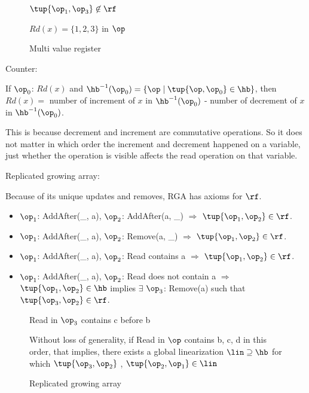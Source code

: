 \begin{figure}[H]
  \centering
  \begin{minipage}{.45\textwidth}
    
    \caption{$\tup{\op_1, \op_3} \not\in \rf$}
    \label{mvreg:a}
  \end{minipage}
  \begin{minipage}{.45\textwidth}
    
    \caption{$Rd(x) = \{1,2,3\}$ in $\op$}
    \label{mvreg:b}
  \end{minipage}
  \caption{Multi value register}
\end{figure}

Counter:

If $\op_0$: $Rd(x)$ and $\hb^{-1}(\op_0) = \{\op \mid \tup{\op, \op_0} \in \hb\}$, then $Rd(x) = $ number of increment of $x$ in $\hb^{-1}(\op_0)$ - number of decrement of $x$ in $\hb^{-1}(\op_0)$.

This is because decrement and increment are commutative operations. So it does not matter in which order the increment and decrement happened on a variable, just whether the operation is visible affects the read operation on that variable.

Replicated growing array:

Because of its unique updates and removes, RGA has axioms for $\rf$.

\begin{itemize}
 \item $\op_1$: AddAfter(\_, a), $\op_2$: AddAfter(a, \_) $\Rightarrow$ $\tup{\op_1, \op_2} \in \rf$.
 \item $\op_1$: AddAfter(\_, a), $\op_2$: Remove(a, \_) $\Rightarrow$ $\tup{\op_1, \op_2} \in \rf$.
 \item $\op_1$: AddAfter(\_, a), $\op_2$: Read contains a $\Rightarrow$ $\tup{\op_1, \op_2} \in \rf$.
 \item $\op_1$: AddAfter(\_, a), $\op_2$: Read does not contain a $\Rightarrow$ $\tup{\op_1, \op_2} \in \hb$ implies $\exists$ $\op_3$: Remove(a) such that $\tup{\op_3, \op_2} \in \rf$.
\end{itemize}



\begin{figure}[ht]
  \centering
  \begin{minipage}{.45\textwidth}
    
    \caption{Read in $\op_3$ contains c before b}
    \label{rga:a}
  \end{minipage}
  \begin{minipage}{.45\textwidth}
    
    \caption{Without loss of generality, if Read in $\op$ contains b, c, d in this order, that implies, there exists a global linearization $\lin \supseteq \hb$ for which $\tup{\op_3, \op_2}$ , $\tup{\op_2, \op_1} \in \lin$ }
    \label{rga:b}
  \end{minipage}
  \caption{Replicated growing array}
\end{figure}

